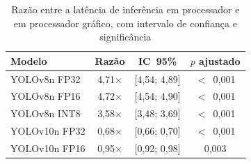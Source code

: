 \begin{table}[H]
\centering
\small
\caption{Razão entre a latência de inferência em processador e em
processador gráfico, com intervalo de confiança e significância}
\label{tab:razoes_ic}
\begin{tabular}{lccc}
\toprule
\textbf{Modelo} & \textbf{Razão} & \textbf{\ac{IC}~95\%} &
\textbf{$p$ ajustado} \\
\midrule
YOLOv8n FP32 & 4,71$\times$ & [4,54; 4,89] & $<$~0,001 \\
YOLOv8n FP16 & 4,72$\times$ & [4,54; 4,90] & $<$~0,001 \\
YOLOv8n INT8 & 3,58$\times$ & [3,48; 3,69] & $<$~0,001 \\
\midrule
YOLOv10n FP32 & 0,68$\times$ & [0,66; 0,70] & $<$~0,001 \\
YOLOv10n FP16 & 0,95$\times$ & [0,92; 0,98] & 0,003 \\
\bottomrule
\end{tabular}
\end{table}

